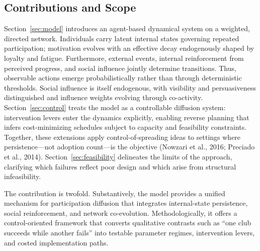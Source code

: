 \documentclass[11pt]{article}
\begin{document}
\subsection{Contributions and Scope}
Section~\ref{sec:model} introduces an agent-based dynamical system on a weighted, directed network. Individuals carry latent internal states governing repeated participation; motivation evolves with an effective decay endogenously shaped by loyalty and fatigue. Furthermore, external events, internal reinforcement from perceived progress, and social influence jointly determine transitions. Thus, observable actions emerge probabilistically rather than through deterministic thresholds. Social influence is itself endogenous, with visibility and persuasiveness distinguished and influence weights evolving through co-activity. Section~\ref{sec:control} treats the model as a controllable diffusion system: intervention levers enter the dynamics explicitly, enabling reverse planning that infers cost-minimizing schedules subject to capacity and feasibility constraints. Together, these extensions apply control-of-spreading ideas to settings where persistence---not adoption count---is the objective (Nowzari et al., 2016; Preciado et al., 2014). Section~\ref{sec:feasibility} delineates the limits of the approach, clarifying which failures reflect poor design and which arise from structural infeasibility.

The contribution is twofold. Substantively, the model provides a unified mechanism for participation diffusion that integrates internal-state persistence, social reinforcement, and network co-evolution. Methodologically, it offers a control-oriented framework that converts qualitative contrasts such as ``one club succeeds while another fails'' into testable parameter regimes, intervention levers, and costed implementation paths.
\end{document}
